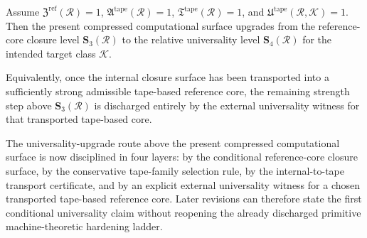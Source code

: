 \begin{proposition}
Assume \(\mathfrak Z^{\mathrm{ref}}(\mathcal R)=1\), \(\mathfrak A^{\mathrm{tape}}(\mathcal R)=1\), \(\mathfrak T^{\mathrm{tape}}(\mathcal R)=1\), and \(\mathfrak U^{\mathrm{tape}}(\mathcal R,\mathcal K)=1\). Then the present compressed computational surface upgrades from the reference-core closure level \(\mathbf S_3(\mathcal R)\) to the relative universality level \(\mathbf S_4(\mathcal R)\) for the intended target class \(\mathcal K\).

Equivalently, once the internal closure surface has been transported into a sufficiently strong admissible tape-based reference core, the remaining strength step above \(\mathbf S_3(\mathcal R)\) is discharged entirely by the external universality witness for that transported tape-based core.
\end{proposition}

\begin{corollary}
The universality-upgrade route above the present compressed computational surface is now disciplined in four layers: by the conditional reference-core closure surface, by the conservative tape-family selection rule, by the internal-to-tape transport certificate, and by an explicit external universality witness for a chosen transported tape-based reference core. Later revisions can therefore state the first conditional universality claim without reopening the already discharged primitive machine-theoretic hardening ladder.
\end{corollary}





